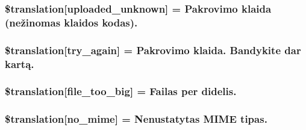 \subsubsection[{\$translation}]{\setlength{\rightskip}{0pt plus 5cm}\$translation\mbox{[}\textquotesingle{}uploaded\+\_\+unknown\textquotesingle{}\mbox{]} = \textquotesingle{}Pakrovimo klaida (nežinomas klaidos kodas).\textquotesingle{}}\label{class_8upload_8lt___l_t_8php_a4a9168e922b827e6a28b5db1c00774ca}
\hypertarget{class_8upload_8lt___l_t_8php_a3afc377bd803683314f413a814243066}{}
\subsubsection[{\$translation}]{\setlength{\rightskip}{0pt plus 5cm}\$translation\mbox{[}\textquotesingle{}try\+\_\+again\textquotesingle{}\mbox{]} = \textquotesingle{}Pakrovimo klaida. Bandykite dar kartą.\textquotesingle{}}\label{class_8upload_8lt___l_t_8php_a3afc377bd803683314f413a814243066}
\hypertarget{class_8upload_8lt___l_t_8php_a476278eb4a0c3df56af068e2d511a741}{}
\subsubsection[{\$translation}]{\setlength{\rightskip}{0pt plus 5cm}\$translation\mbox{[}\textquotesingle{}file\+\_\+too\+\_\+big\textquotesingle{}\mbox{]} = \textquotesingle{}Failas per didelis.\textquotesingle{}}\label{class_8upload_8lt___l_t_8php_a476278eb4a0c3df56af068e2d511a741}
\hypertarget{class_8upload_8lt___l_t_8php_a191a55df8e3bb7f3c51b70f3c1932e02}{}
\subsubsection[{\$translation}]{\setlength{\rightskip}{0pt plus 5cm}\$translation\mbox{[}\textquotesingle{}no\+\_\+mime\textquotesingle{}\mbox{]} = \textquotesingle{}Nenustatytas M\+I\+M\+E tipas.\textquotesingle{}}\label{class_8upload_8lt___l_t_8php_a191a55df8e3bb7f3c51b70f3c1932e02}
\hypertarget{class_8upload_8lt___l_t_8php_a4d32343e2699edd6fd435f9c832cb9c7}{}
